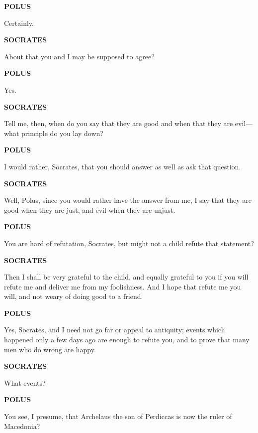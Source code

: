 \documentclass[11pt,letter]{article}
\begin{document}
\par \textbf{POLUS}
\par   Certainly.

\par \textbf{SOCRATES}
\par   About that you and I may be supposed to agree?

\par \textbf{POLUS}
\par   Yes.

\par \textbf{SOCRATES}
\par   Tell me, then, when do you say that they are good and when that they are evil—what principle do you lay down?

\par \textbf{POLUS}
\par   I would rather, Socrates, that you should answer as well as ask that question.

\par \textbf{SOCRATES}
\par   Well, Polus, since you would rather have the answer from me, I say that they are good when they are just, and evil when they are unjust.

\par \textbf{POLUS}
\par   You are hard of refutation, Socrates, but might not a child refute that statement?

\par \textbf{SOCRATES}
\par   Then I shall be very grateful to the child, and equally grateful to you if you will refute me and deliver me from my foolishness. And I hope that refute me you will, and not weary of doing good to a friend.

\par \textbf{POLUS}
\par   Yes, Socrates, and I need not go far or appeal to antiquity; events which happened only a few days ago are enough to refute you, and to prove that many men who do wrong are happy.

\par \textbf{SOCRATES}
\par   What events?

\par \textbf{POLUS}
\par   You see, I presume, that Archelaus the son of Perdiccas is now the ruler of Macedonia?
\end{document}
